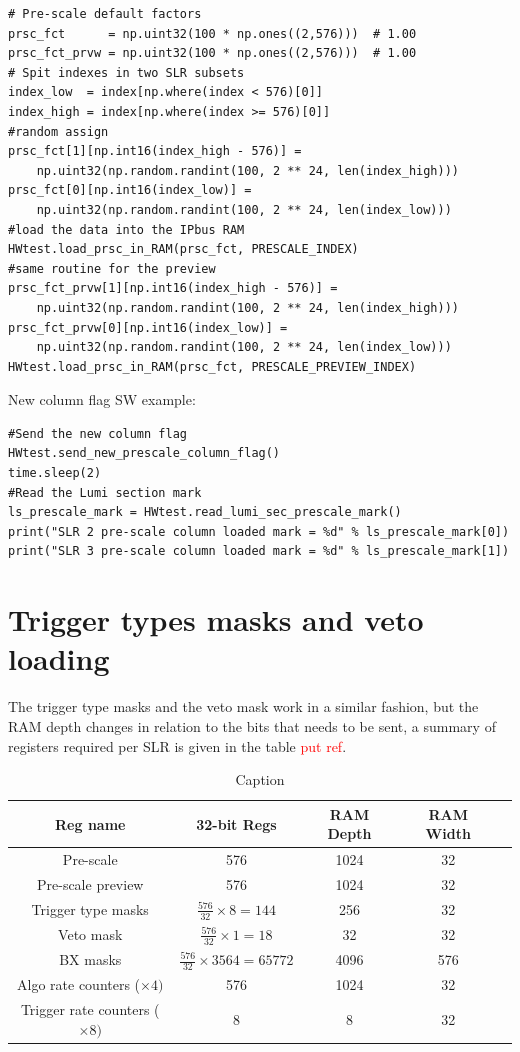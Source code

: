 \documentclass[a4paper,11pt]{article}
\begin{document}
\begin{verbatim}
# Pre-scale default factors
prsc_fct      = np.uint32(100 * np.ones((2,576)))  # 1.00
prsc_fct_prvw = np.uint32(100 * np.ones((2,576)))  # 1.00
# Spit indexes in two SLR subsets
index_low  = index[np.where(index < 576)[0]]
index_high = index[np.where(index >= 576)[0]]
#random assign 
prsc_fct[1][np.int16(index_high - 576)] = 
    np.uint32(np.random.randint(100, 2 ** 24, len(index_high)))
prsc_fct[0][np.int16(index_low)] = 
    np.uint32(np.random.randint(100, 2 ** 24, len(index_low)))
#load the data into the IPbus RAM
HWtest.load_prsc_in_RAM(prsc_fct, PRESCALE_INDEX)
#same routine for the preview
prsc_fct_prvw[1][np.int16(index_high - 576)] = 
    np.uint32(np.random.randint(100, 2 ** 24, len(index_high)))
prsc_fct_prvw[0][np.int16(index_low)] = 
    np.uint32(np.random.randint(100, 2 ** 24, len(index_low)))
HWtest.load_prsc_in_RAM(prsc_fct, PRESCALE_PREVIEW_INDEX)
\end{verbatim}

New column flag SW example:

\begin{verbatim}
#Send the new column flag 
HWtest.send_new_prescale_column_flag()
time.sleep(2)
#Read the Lumi section mark
ls_prescale_mark = HWtest.read_lumi_sec_prescale_mark()
print("SLR 2 pre-scale column loaded mark = %d" % ls_prescale_mark[0])
print("SLR 3 pre-scale column loaded mark = %d" % ls_prescale_mark[1])
\end{verbatim}
    
\section{Trigger types masks and veto loading}

The trigger type masks and the veto mask work in a similar fashion, but the RAM depth changes in relation to the bits that needs to be sent, a summary of registers required per SLR is given in the table \textcolor{red}{put ref}.
\begin{table}[]
    \centering
    \begin{tabular}{c|c|c|c|c}
    Reg name & 32-bit Regs & RAM Depth & RAM Width \\
    \hline
    Pre-scale &  576 & 1024 & 32  \\ 
    Pre-scale preview &  576 & 1024 & 32 \\ 
    Trigger type masks &  $\frac{576}{32}\times 8 = 144 $ & 256 & 32 \\ 
    Veto mask &  $\frac{576}{32}\times 1 = 18 $ & 32 & 32\\ 
    BX masks &  $\frac{576}{32}\times 3564 = 65772 $ & 4096 & 576 \\
    Algo rate counters ($\times 4)$ &  576 & 1024 & 32 \\ 
    Trigger rate counters ($\times 8)$ &  8 & 8 & 32 \\ 
    
    \end{tabular}
    \caption{Caption}
    \label{tab:my_label}
\end{table}
\end{document}
